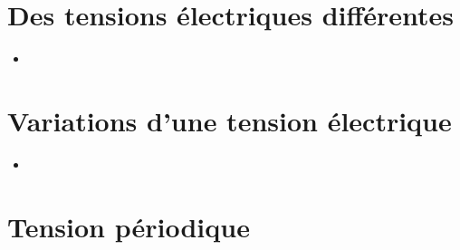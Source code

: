 \documentclass[12pt,a4paper]{article}
\date{}
\title{}
\begin{document}
	
	

\section{Des tensions électriques différentes}








\begin{myexos}
	\begin{itemize}
		\item {}
	\end{itemize}
\end{myexos}

\section{Variations d'une tension électrique}





\begin{myexos}
	\begin{multicols}{2}
	
		\begin{itemize}
			\item {}
		\end{itemize}
	
	\end{multicols}
\end{myexos}


\section{Tension périodique}





\begin{myexos}
\end{myexos}
\end{document}
